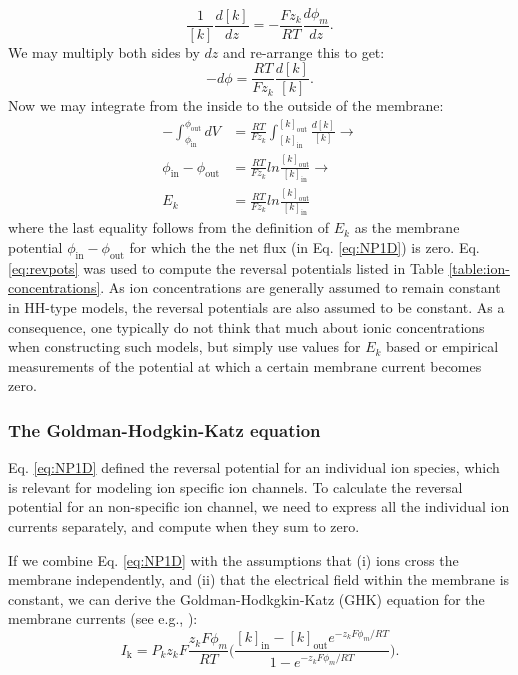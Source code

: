 \begin{equation}
\frac{1}{[k]} \frac{d[k]}{dz} = - \frac{Fz_k}{RT}  \frac{d\phi_m}{dz}.
\end{equation}
We may multiply both sides by $dz$ and re-arrange this to get:
\begin{equation}
-d\phi = \frac{RT}{Fz_k}  \frac{d[k]}{[k]}.
\end{equation}
Now we may integrate from the inside to the outside of the membrane:
\begin{align}
-\int_{\phi_{\text{in}}}^{\phi_{\text{out}}}  dV &= \frac{RT}{Fz_k}  \int_{[k]_{\text{in}}}^{[k]_{\text{out}}} \frac{d[k]}{[k]} \rightarrow \\
\phi_{\text{in}}-\phi_{\text{out}} &= \frac{RT}{Fz_k} ln \frac{[k]_{\text{out}}} {[k]_{\text{in}}} \rightarrow \\
E_k & =  \frac{RT}{Fz_k}  ln \frac{[k]_{\text{out}}} {[k]_{\text{in}}} 
\label{eq:revpots}
\end{align}
where the last equality follows from the definition of $E_k$ as the membrane potential $\phi_{\text{in}}-\phi_{\text{out}}$ for which the the net flux (in Eq. \ref{eq:NP1D}) is zero. Eq. \ref{eq:revpots} was used to compute the reversal potentials listed in Table \ref{table:ion-concentrations}. As ion concentrations are generally assumed to remain constant in HH-type models, the reversal potentials are also assumed to be constant. As a consequence, one typically do not think that much about ionic concentrations when constructing such models, but simply use values for $E_k$ based or empirical measurements of the potential at which a certain membrane current becomes zero.

\subsubsection{The Goldman-Hodgkin-Katz equation}
Eq. \ref{eq:NP1D} defined the reversal potential for an individual ion species, which is relevant for modeling ion specific ion channels. To calculate the reversal potential for an non-specific ion channel, we need to express all the individual ion currents separately, and compute when they sum to zero. 

If we combine Eq. \ref{eq:NP1D} with the assumptions that (i) ions cross the membrane independently, and (ii) that the electrical field within the membrane is constant, we can derive the Goldman-Hodkgkin-Katz (GHK) equation for the membrane currents (see e.g., \cite{hodgkin1949, johnston1994foundations}):
\begin{equation}
I_\text{k} = P_k z_k F \frac{z_k F \phi_m}{R T} \Big( \frac{[k]_\text{in}-[k]_\text{out} e^{-z_k F \phi_m/RT}} {1-e^{-z_k F \phi_m/RT}} \Big).
\label{eq:GHK}
\end{equation}

